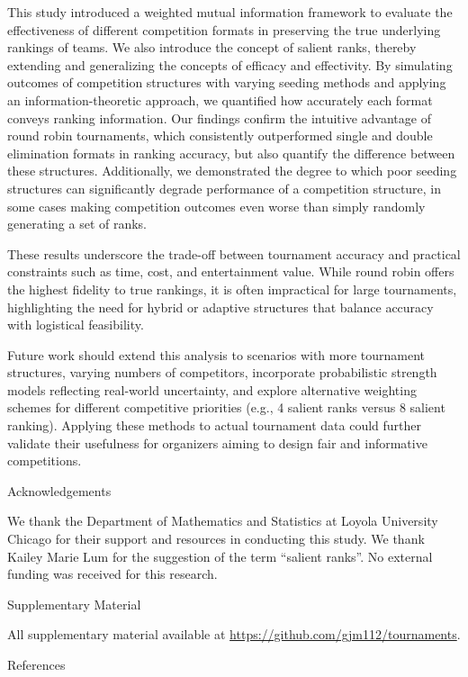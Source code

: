 \documentclass[
  12pt]{article}
\begin{document}
This study introduced a weighted mutual information framework to
evaluate the effectiveness of different competition formats in
preserving the true underlying rankings of teams. We also introduce the
concept of salient ranks, thereby extending and generalizing the
concepts of efficacy and effectivity. By simulating outcomes of
competition structures with varying seeding methods and applying an
information-theoretic approach, we quantified how accurately each format
conveys ranking information. Our findings confirm the intuitive
advantage of round robin tournaments, which consistently outperformed
single and double elimination formats in ranking accuracy, but also
quantify the difference between these structures. Additionally, we
demonstrated the degree to which poor seeding structures can
significantly degrade performance of a competition structure, in some
cases making competition outcomes even worse than simply randomly
generating a set of ranks.

These results underscore the trade-off between tournament accuracy and
practical constraints such as time, cost, and entertainment value. While
round robin offers the highest fidelity to true rankings, it is often
impractical for large tournaments, highlighting the need for hybrid or
adaptive structures that balance accuracy with logistical feasibility.

Future work should extend this analysis to scenarios with more
tournament structures, varying numbers of competitors, incorporate
probabilistic strength models reflecting real-world uncertainty, and
explore alternative weighting schemes for different competitive
priorities (e.g., 4 salient ranks versus 8 salient ranking). Applying
these methods to actual tournament data could further validate their
usefulness for organizers aiming to design fair and informative
competitions.

Acknowledgements

We thank the Department of Mathematics and Statistics at Loyola
University Chicago for their support and resources in conducting this
study. We thank Kailey Marie Lum for the suggestion of the term
``salient ranks''. No external funding was received for this research.

Supplementary Material

All supplementary material available at
\url{https://github.com/gjm112/tournaments}.

References



\end{document}
